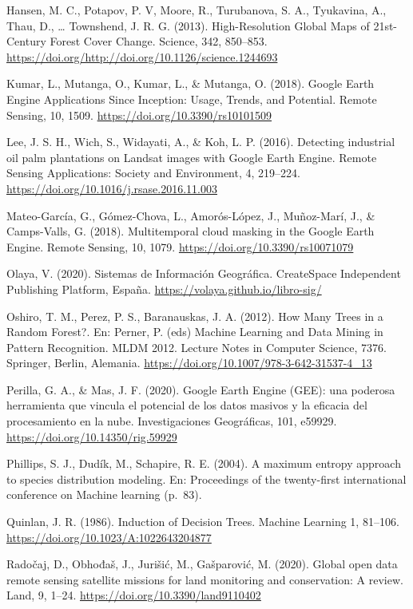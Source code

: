 \documentclass[
  12pt,
  letterpaper,
  twoside]{book}
\begin{document}
Hansen, M. C., Potapov, P. V, Moore, R., Turubanova, S. A., Tyukavina, A., Thau, D., \ldots{} Townshend, J. R. G. (2013). High-Resolution Global Maps of 21st-Century Forest Cover Change. Science, 342, 850--853. \url{https://doi.org/http://doi.org/10.1126/science.1244693}

Kumar, L., Mutanga, O., Kumar, L., \& Mutanga, O. (2018). Google Earth Engine Applications Since Inception: Usage, Trends, and Potential. Remote Sensing, 10, 1509. \url{https://doi.org/10.3390/rs10101509}

Lee, J. S. H., Wich, S., Widayati, A., \& Koh, L. P. (2016). Detecting industrial oil palm plantations on Landsat images with Google Earth Engine. Remote Sensing Applications: Society and Environment, 4, 219--224. \url{https://doi.org/10.1016/j.rsase.2016.11.003}

Mateo-García, G., Gómez-Chova, L., Amorós-López, J., Muñoz-Marí, J., \& Camps-Valls, G. (2018). Multitemporal cloud masking in the Google Earth Engine. Remote Sensing, 10, 1079. \url{https://doi.org/10.3390/rs10071079}

Olaya, V. (2020). Sistemas de Información Geográfica. CreateSpace Independent Publishing Platform, España. \url{https://volaya.github.io/libro-sig/}

Oshiro, T. M., Perez, P. S., Baranauskas, J. A. (2012). How Many Trees in a Random Forest?. En: Perner, P. (eds) Machine Learning and Data Mining in Pattern Recognition. MLDM 2012. Lecture Notes in Computer Science, 7376. Springer, Berlin, Alemania. \url{https://doi.org/10.1007/978-3-642-31537-4_13}

Perilla, G. A., \& Mas, J. F. (2020). Google Earth Engine (GEE): una poderosa herramienta que vincula el potencial de los datos masivos y la eficacia del procesamiento en la nube. Investigaciones Geográficas, 101, e59929. \url{https://doi.org/10.14350/rig.59929}

Phillips, S. J., Dudík, M., Schapire, R. E. (2004). A maximum entropy approach to species distribution modeling. En: Proceedings of the twenty-first international conference on Machine learning (p.~83).

Quinlan, J. R. (1986). Induction of Decision Trees. Machine Learning 1, 81--106. \url{https://doi.org/10.1023/A:1022643204877}

Radočaj, D., Obhođaš, J., Jurišić, M., Gašparović, M. (2020). Global open data remote sensing satellite missions for land monitoring and conservation: A review. Land, 9, 1--24. \url{https://doi.org/10.3390/land9110402}
\end{document}
